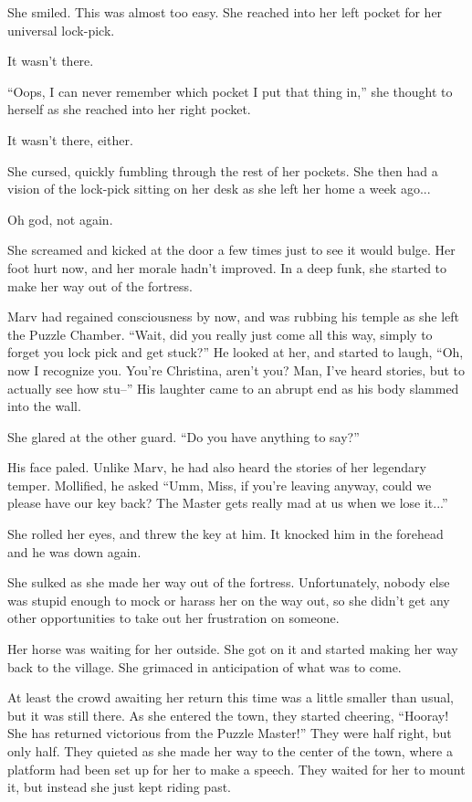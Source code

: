 \documentclass[showtrims,b6paper,draft,10pt]{memoir}
\begin{document}
She smiled.  This was almost too easy.  She reached into her left pocket for her universal lock-pick.

It wasn’t there.

``Oops, I can never remember which pocket I put that thing in,'' she thought to herself as she reached into her right pocket.

It wasn’t there, either.

She cursed, quickly fumbling through the rest of her pockets.  She then had a vision of the lock-pick sitting on her desk as she left her home a week ago...

Oh god, not again.

She screamed and kicked at the door a few times just to see it would bulge.  Her foot hurt now, and her morale hadn’t improved.  In a deep funk, she started to make her way out of the fortress.

Marv had regained consciousness by now, and was rubbing his temple as she left the Puzzle Chamber.  ``Wait, did you really just come all this way, simply to forget you lock pick and get stuck?''  He looked at her, and started to laugh, ``Oh, now I recognize you.  You’re Christina, aren’t you?  Man, I’ve heard stories, but to actually see how stu--'' His laughter came to an abrupt end as his body slammed into the wall.

She glared at the other guard.  “Do you have anything to say?”

His face paled.  Unlike Marv, he had also heard the stories of her legendary temper.  Mollified, he asked  ``Umm, Miss, if you’re leaving anyway, could we please have our key back?  The Master gets really mad at us when we lose it...''

She rolled her eyes, and threw the key at him.  It knocked him in the forehead and he was down again.

\timeskip
She sulked as she made her way out of the fortress.  Unfortunately, nobody else was stupid enough to mock or harass her on the way out, so she didn’t get any other opportunities to take out her frustration on someone.

Her horse was waiting for her outside.  She got on it and started making her way back to the village.  She grimaced in anticipation of what was to come.

\timeskip

At least the crowd awaiting her return this time was a little smaller than usual, but it was still there.  As she entered the town, they started cheering, ``Hooray!  She has returned victorious from the Puzzle Master!''    They were half right, but only half.  They quieted as she made her way to the center of the town, where a platform had been set up for her to make a speech.  They waited for her to mount it, but instead she just kept riding past.
\end{document}
